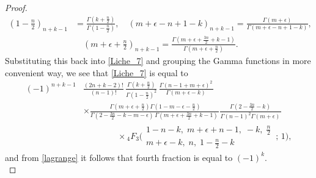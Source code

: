 \documentclass{article}
\theoremstyle{boldremark}
\renewcommand\[{\begin{equation}}
\renewcommand\]{\end{equation}}
\theoremstyle{definition}
\numberwithin{equation}{section}
\begin{document}
\begin{proof}
\begin{align*}
\left(1-\frac{n}{2}\right)_{n+k-1} &= \frac{\Gamma(k+\frac{n}{2})}{\Gamma(1-\frac{n}{2})}, \quad (m+\epsilon -n+1 -k)_{n+k-1} = \frac{\Gamma(m+\epsilon)}{\Gamma(m+\epsilon -n+1-k)},\\& \quad \left(m+\epsilon + \frac{n}{2} \right)_{n+k-1} = \frac{\Gamma(m+\epsilon + \frac{3n}{2} +k -1)}{\Gamma(m+\epsilon + \frac{n}{2})}.
\end{align*}
Substituting this back into \eqref{Liche_7} and grouping the Gamma functions in more convenient way, we see that \eqref{Liche_7} is equal to
\begin{align*}
    (-1)^{n+k-1}&\frac{(2n+k-2)!}{(n-1)!}\,
    \frac{\Gamma(k+\frac{n}{2})}{\Gamma(1-\frac{n}{2})^2}\,\frac{\Gamma(n-1 + m + \epsilon)^{2}\,}
    {\Gamma\!\left(m+\epsilon-k\right)\,}\\
    & \times \frac{ \,\Gamma(m+\epsilon + \frac{n}{2})\Gamma\!\left(1-m-\epsilon-\frac{n}{2}\right)}{\Gamma\!\left(2-\frac{3n}{2}-k-m-\epsilon\right)\,\Gamma(m+\epsilon + \frac{3n}{2} +k -1)\,}
    \frac{
\Gamma\!\left(2-\frac{3n}{2}-k\right)\,
}{\Gamma(n-1)^2
\Gamma(m+\epsilon)\,}
\\\nonumber
&\qquad\qquad\times
{}_4F_3\!\Biggl(
\begin{matrix}
1-n-k,\; m+\epsilon+n-1,\; -k,\; \frac{n}{2} \\
m+\epsilon-k,\; n,\; 1-\frac{n}{2}-k
\end{matrix}
\,;\,1\Biggr),
\end{align*}
and from \eqref{lagrange} it follows that fourth fraction is equal to $(-1)^k$.\\


\end{proof}
\end{document}
